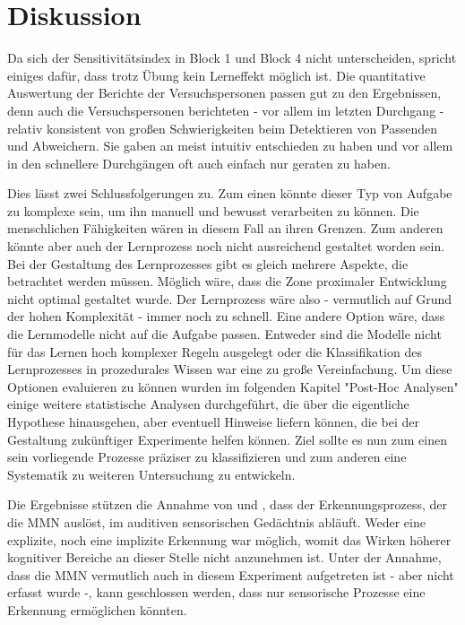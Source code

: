 \documentclass[doc,a4paper,12pt]{apa6}
\begin{document}

\section{Diskussion}

Da sich der Sensitivitätsindex in Block 1 und Block 4 nicht unterscheiden, spricht einiges dafür, dass trotz Übung kein Lerneffekt möglich ist. Die quantitative Auswertung der Berichte der Versuchspersonen passen gut zu den Ergebnissen, denn auch die Versuchspersonen berichteten - vor allem im letzten Durchgang - relativ konsistent von großen Schwierigkeiten beim Detektieren von Passenden und Abweichern. Sie gaben an meist intuitiv entschieden zu haben und vor allem in den schnellere Durchgängen oft auch einfach nur geraten zu haben.

Dies lässt zwei Schlussfolgerungen zu. Zum einen könnte dieser Typ von Aufgabe zu komplexe sein, um ihn manuell und bewusst verarbeiten zu können. Die menschlichen Fähigkeiten wären in diesem Fall an ihren Grenzen. Zum anderen könnte aber auch der Lernprozess noch nicht ausreichend gestaltet worden sein. Bei der Gestaltung des Lernprozesses gibt es gleich mehrere Aspekte, die betrachtet werden müssen. Möglich wäre, dass die Zone proximaler Entwicklung nicht optimal gestaltet wurde. Der Lernprozess wäre also - vermutlich auf Grund der hohen Komplexität - immer noch zu schnell. Eine andere Option wäre, dass die Lernmodelle nicht auf die Aufgabe passen. Entweder sind die Modelle nicht für das Lernen hoch komplexer Regeln ausgelegt oder die Klassifikation des Lernprozesses in prozedurales Wissen war eine zu große Vereinfachung. Um diese Optionen evaluieren zu können wurden im folgenden Kapitel "Post-Hoc Analysen" einige weitere statistische Analysen durchgeführt, die über die eigentliche Hypothese hinausgehen, aber eventuell Hinweise liefern können, die bei der Gestaltung zukünftiger Experimente helfen können. Ziel sollte es nun zum einen sein vorliegende Prozesse präziser zu klassifizieren und zum anderen eine Systematik zu weiteren Untersuchung zu entwickeln.

Die Ergebnisse stützen die Annahme von \textcite{paavilainen2007preattentive} und \textcite{bendixen2008rapid}, dass der Erkennungsprozess, der die MMN auslöst, im auditiven sensorischen Gedächtnis abläuft. Weder eine explizite, noch eine implizite Erkennung war möglich, womit das Wirken höherer kognitiver Bereiche an dieser Stelle nicht anzunehmen ist. Unter der Annahme, dass die MMN vermutlich auch in diesem Experiment aufgetreten ist - aber nicht erfasst wurde -, kann geschlossen werden, dass nur sensorische Prozesse eine Erkennung ermöglichen könnten.
\end{document}
